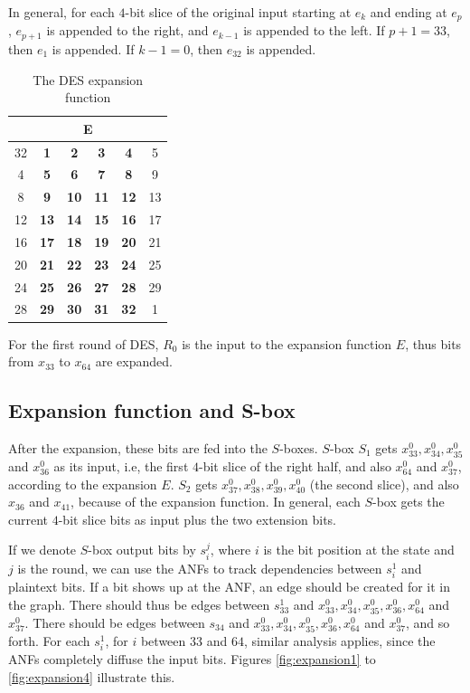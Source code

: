 \documentclass{report}
\begin{document}
In general, for each $4$-bit slice of the original input starting at $e_k$ and ending at $e_p$, $e_{p+1}$ is appended to the right, and $e_{k-1}$ is appended to the left. If $p+1 = 33$, then $e_1$ is appended. If $k-1 = 0$, then $e_{32}$ is appended.

\begin{table}[h!]
\centering
\begin{tabular}{|c|c|c|c|c|c|}
\hline
\multicolumn{6}{|c|}{E}                                         \\ \hline
32 & \textbf{1}  & \textbf{2}  & \textbf{3}  & \textbf{4}  & 5  \\ \hline
4  & \textbf{5}  & \textbf{6}  & \textbf{7}  & \textbf{8}  & 9  \\ \hline
8  & \textbf{9}  & \textbf{10} & \textbf{11} & \textbf{12} & 13 \\ \hline
12 & \textbf{13} & \textbf{14} & \textbf{15} & \textbf{16} & 17 \\ \hline
16 & \textbf{17} & \textbf{18} & \textbf{19} & \textbf{20} & 21 \\ \hline
20 & \textbf{21} & \textbf{22} & \textbf{23} & \textbf{24} & 25 \\ \hline
24 & \textbf{25} & \textbf{26} & \textbf{27} & \textbf{28} & 29 \\ \hline
28 & \textbf{29} & \textbf{30} & \textbf{31} & \textbf{32} & 1  \\ \hline
\end{tabular}
\caption{The DES expansion function}
\label{tab:expansion}
\end{table}

For the first round of DES, $R_0$ is the input to the expansion function $E$, thus bits from $x_{33}$ to $x_{64}$ are expanded.

\subsection{Expansion function and S-box}
After the expansion, these bits are fed into the $S$-boxes. $S$-box $S_1$ gets $x_{33}^0, x_{34}^0, x_{35}^0$ and $x_{36}^0$ as its input, i.e, the first $4$-bit slice of the right half, and also $x_{64}^0$ and $x_{37}^0$, according to the expansion $E$. $S_2$ gets $x_{37}^0, x_{38}^0, x_{39}^0, x_{40}^0$ (the second slice), and also $x_{36}$ and $x_{41}$, because of the expansion function. In general, each $S$-box gets the current $4$-bit slice bits as input plus the two extension bits.

If we denote $S$-box output bits by $s_i^j$, where $i$ is the bit position at the state and $j$ is the round, we can use the ANFs to track dependencies between $s_i^1$ and plaintext bits. If a bit shows up at the ANF, an edge should be created for it in the graph. There should thus be edges between $s_{33}^1$ and $x_{33}^0, x_{34}^0, x_{35}^0, x_{36}^0, x_{64}^0$ and $x_{37}^0$. There should be edges between $s_{34}$ and $x_{33}^0, x_{34}^0, x_{35}^0, x_{36}^0, x_{64}^0$ and $x_{37}^0$, and so forth. For each $s_i^1$, for $i$ between $33$ and $64$, similar analysis applies, since the ANFs completely diffuse the input bits. Figures \ref{fig:expansion1} to \ref{fig:expansion4} illustrate this.
\end{document}

